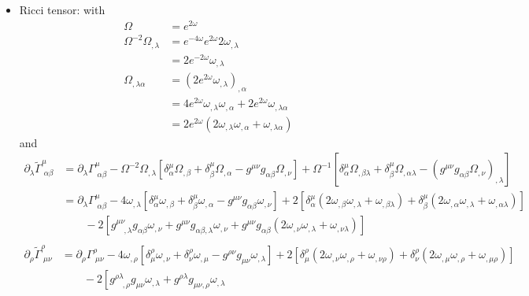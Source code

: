\documentclass[10pt,a4paper]{book}
\theoremstyle{definition}
\begin{document}
\begin{itemize}
\item Ricci tensor: with
\begin{align}
    \Omega&=e^{2\omega}\\
    \Omega^{-2}\Omega_{,\lambda}
    &=e^{-4\omega}e^{2\omega}2\omega_{,\lambda}\\
    &=2e^{-2\omega}\omega_{,\lambda}\\
    \Omega_{,\lambda\alpha}
    &=\left(2e^{2\omega}\omega_{,\lambda}\right)_{,\alpha}\\
    &=4e^{2\omega}\omega_{,\lambda}\omega_{,\alpha}+2e^{2\omega}\omega_{,\lambda\alpha}\\
    &=2e^{2\omega}\left(2\omega_{,\lambda}\omega_{,\alpha}+\omega_{,\lambda\alpha}\right)
\end{align}
and
\begin{align}
\partial_\lambda\tilde\Gamma^\mu_{\;\alpha\beta}
&=\partial_\lambda\Gamma^\mu_{\;\alpha\beta}
-\Omega^{-2}\Omega_{,\lambda}\left[
 \delta^\mu_\alpha\Omega_{,\beta}
+\delta_\beta^\mu\Omega_{,\alpha}
-g^{\mu\nu}g_{\alpha\beta}\Omega_{,\nu}
\right]
+\Omega^{-1}\left[
 \delta^\mu_\alpha\Omega_{,\beta\lambda}
+\delta_\beta^\mu\Omega_{,\alpha\lambda}
-(g^{\mu\nu}g_{\alpha\beta}\Omega_{,\nu})_{,\lambda}
\right]\\
&=\partial_\lambda\Gamma^\mu_{\;\alpha\beta}
-4\omega_{,\lambda}\left[
 \delta^\mu_\alpha\omega_{,\beta}
+\delta_\beta^\mu\omega_{,\alpha}
-g^{\mu\nu}g_{\alpha\beta}\omega_{,\nu}
\right]
+2\left[
 \delta^\mu_\alpha\left(2\omega_{,\beta}\omega_{,\lambda}+\omega_{,\beta\lambda}\right)
+\delta_\beta^\mu\left(2\omega_{,\alpha}\omega_{,\lambda}+\omega_{,\alpha\lambda}\right)\right]\\
&\qquad-2\left[
 g^{\mu\nu}_{\quad,\lambda}g_{\alpha\beta}\omega_{,\nu}
+g^{\mu\nu}g_{\alpha\beta,\lambda}\omega_{,\nu}
+g^{\mu\nu}g_{\alpha\beta}(2\omega_{,\nu}\omega_{,\lambda}+\omega_{,\nu\lambda})\right]\\
\end{align}
\begin{align}
\partial_\rho\tilde\Gamma^\rho_{\;\mu\nu}
&=\partial_\rho\Gamma^\rho_{\;\mu\nu}
-4\omega_{,\rho}\left[
 \delta^\rho_\mu\omega_{,\nu}
+\delta_\nu^\rho\omega_{,\mu}
-g^{\rho\nu}g_{\mu\nu}\omega_{,\lambda}
\right]
+2\left[
 \delta^\rho_\mu\left(2\omega_{,\nu}\omega_{,\rho}+\omega_{,\nu\rho}\right)
+\delta_\nu^\rho\left(2\omega_{,\mu}\omega_{,\rho}+\omega_{,\mu\rho}\right)\right]\\
&\qquad-2\left[
 g^{\rho\lambda}_{\quad,\rho}g_{\mu\nu}\omega_{,\lambda}
+g^{\rho\lambda}g_{\mu\nu,\rho}\omega_{,\lambda}

\end{align}
\end{itemize}
\end{document}
